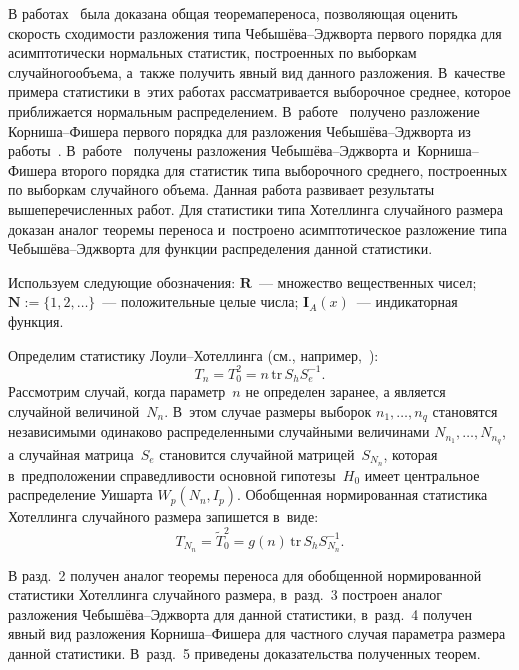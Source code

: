 \begin{multicols}{2}
В работах~\cite{BenKorGal13,BenKorGal12} была доказана общая тео\-ре\-ма\linebreak переноса, 
позволяющая оценить ско\-рость сходимости разложения типа Че\-бы\-шё\-ва--Эдж\-вор\-та 
первого порядка для асимптотически нормальных статистик, построенных по выборкам 
случайного\linebreak объема, а~также получить явный вид данного разложения. В~качестве 
примера статистики в~этих работах рассматривается выборочное среднее, которое 
приближается нормальным распределением. В~работе~\cite{MMU16} получено 
разложение Кор\-ни\-ша--Фи\-ше\-ра первого порядка для разложения Че\-бы\-шё\-ва--Эдж\-вор\-та из 
работы~\cite{BenKorGal13}. В~работе~\cite{CMU} получены разложения 
Че\-бы\-шё\-ва--Эдж\-вор\-та и~Кор\-ни\-ша--Фи\-ше\-ра второго порядка для статистик типа выборочного 
среднего, построенных по выборкам случайного объема. Данная работа развивает 
результаты вышеперечисленных работ. Для статистики типа Хотеллинга случайного 
размера доказан аналог теоремы переноса и~построено асимптотическое разложение 
типа Че\-бы\-шё\-ва--Эдж\-вор\-та для функции распределения данной статистики.

Используем следующие обозначения: $\mathbf{R}$~--- множество вещественных чисел;
$\mathbf{N}:=\{1,2,\ldots\}$~--- положительные целые числа; $\mathbf{I}_{A}(x)$~--- индикаторная функция.

Определим статистику Лоу\-ли--Хо\-тел\-лин\-га (см., например,~\cite{UAF2016}):
\begin{equation}
\label{hotel}
T_n=T^2_0=n\,\mathrm{tr}\,S_h S_e^{-1}.
\end{equation}
Рассмотрим случай, когда параметр~$n$  не определен заранее, а является 
случайной величиной~$N_n$. В~этом случае размеры выборок $n_1, \ldots, n_q$ 
становятся независимыми одинаково распределенными случайными величинами 
$N_{n_1}, \ldots, N_{n_q}$, а случайная матрица~$S_e$ становится случайной 
матрицей~$S_{N_n}$, которая в~предположении справедливости основной гипотезы~$H_0$ 
имеет центральное распределение Уишарта $W_p(N_n, I_p)$. Обобщенная 
нормированная статистика Хотеллинга случайного размера запишется в~виде:
\begin{equation}
\label{r_hotel}
T_{N_n} = \widetilde{T}^2_0= g(n)\,\mathrm{tr}\,S_h S_{N_n}^{-1}.
\end{equation}

 В разд.~2 получен аналог теоремы переноса для обобщенной 
нормированной статистики Хотеллинга случайного размера, в~разд.~3 
построен аналог разложения Че\-бы\-шё\-ва--Эдж\-вор\-та для данной статистики, в~разд.~4 
получен явный вид разложения Кор\-ни\-ша--Фи\-ше\-ра для частного случая 
параметра размера данной статистики. В~разд.~5 приведены 
доказательства полученных тео\-рем.



\end{multicols}
